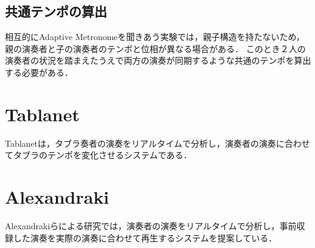 \subsection{共通テンポの算出}
相互的にAdaptive Metronomeを聞きあう実験では，親子構造を持たないため，親の演奏者と子の演奏者のテンポと位相が異なる場合がある．
このとき２人の演奏者の状況を踏まえたうえで両方の演奏が同期するような共通のテンポを算出する必要がある．

\section{Tablanet}
Tablanet\cite{tablanet}は，タブラ奏者の演奏をリアルタイムで分析し，演奏者の演奏に合わせてタブラのテンポを変化させるシステムである．

\section{Alexandraki}
Alexandrakiらによる研究\cite{alexandraki:2013}\cite{alexandraki:2014}では，演奏者の演奏をリアルタイムで分析し，事前収録した演奏を実際の演奏に合わせて再生するシステムを提案している．
